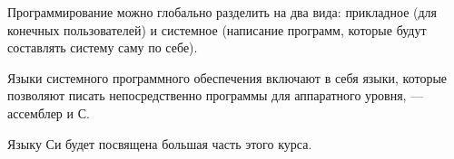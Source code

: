 Программирование можно глобально разделить на два вида: прикладное (для конечных пользователей) и системное (написание программ, которые будут составлять систему саму по себе).

Языки системного программного обеспечения включают в себя языки, которые позволяют писать непосредственно программы для аппаратного уровня, --- ассемблер и С.

Языку Си будет посвящена большая часть этого курса.
